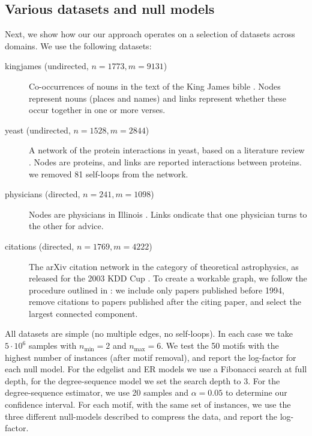 \subsection{Various datasets and null models}
\label{section:various}

Next, we show how our our approach operates on a selection of datasets across domains. We use the following datasets:
\begin{description}

\item[kingjames (undirected, $n=1773, m=9131$)] Co-occurrences of nouns in the text of the King James bible \cite{konect:2014:moreno_names,konect:harrison}. Nodes represent nouns (places and names) and links represent whether these occur together in one or more verses.
\item[yeast (undirected, $n=1528, m=2844$)] A network of the protein interactions in yeast, based on a literature review \cite{reguly2006comprehensive}. Nodes are proteins, and links are reported interactions between proteins. we removed 81 self-loops from the network.
\item[physicians (directed, $n=241, m=1098$)] Nodes are physicians in Illinois \cite{konect:2015:moreno_innovation,konect:coleman1957}. Links ondicate that one physician turns to the other for advice.
\item[citations (directed, $n=1769, m=4222$)] The arXiv citation network in the category of theoretical astrophysics, as released for the 2003 KDD Cup \cite{gehrke2003overview}. To create a workable graph, we follow the procedure outlined in \cite{carstens2013motifs}: we include only papers published before 1994, remove citations to papers published after the citing paper, and select the largest connected component.
\end{description}

All datasets are simple (no multiple edges, no self-loops). In each case we take $5 \cdot 10^6$ samples with $n_\text{min} = 2$ and $n_\text{max} = 6$. We test the 50 motifs with the highest number of instances (after motif removal), and report the log-factor for each null model. For the edgelist and ER models we use a Fibonacci search at full depth, for the degree-sequence model we set the search depth to $3$. For the degree-sequence estimator, we use 20 samples and $\alpha=0.05$ to determine our confidence interval. For each motif, with the same set of instances, we use the three different null-models described to compress the data, and report the log-factor.   

